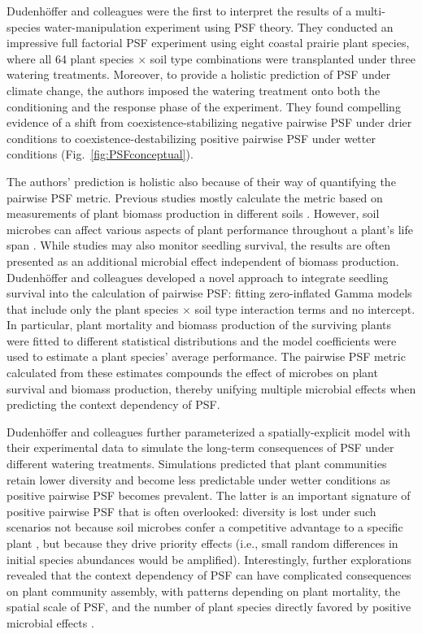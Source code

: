 \documentclass[hidelinks,letterpaper, 11pt]{article}
\begin{document}
Dudenh{\"o}ffer and colleagues were the first to interpret the results of a multi-species water-manipulation experiment using PSF theory. 
They conducted an impressive full factorial PSF experiment using eight coastal prairie plant species, where all 64 plant species $\times$ soil type combinations were transplanted under three watering treatments.
Moreover, to provide a holistic prediction of PSF under climate change, the authors imposed the watering treatment onto both the conditioning and the response phase of the experiment.
They found compelling evidence of a shift from coexistence-stabilizing negative pairwise PSF under drier conditions to coexistence-destabilizing positive pairwise PSF under wetter conditions (Fig.~\ref{fig:PSFconceptual}).
\medskip


The authors' prediction is holistic also because of their way of quantifying the pairwise PSF metric. 
Previous studies mostly calculate the metric based on measurements of plant biomass production in different soils \citep{Crawford2019}.
However, soil microbes can affect various aspects of plant performance throughout a plant's life span \citep{Dudenhoffer2017}.
While studies may also monitor seedling survival, the results are often presented as an additional microbial effect independent of biomass production.
Dudenh{\"o}ffer and colleagues developed a novel approach to integrate seedling survival into the calculation of pairwise PSF: fitting zero-inflated Gamma models that include only the plant species $\times$ soil type interaction terms and no intercept.
In particular, plant mortality and biomass production of the surviving plants were fitted to different statistical distributions and the model coefficients were used to estimate a plant species' average performance. 
The pairwise PSF metric \citep{Bever1997} calculated from these estimates compounds the effect of microbes on plant survival and biomass production, thereby unifying multiple microbial effects when predicting the context dependency of PSF. 
\medskip


Dudenh{\"o}ffer and colleagues further parameterized a spatially-explicit model with their experimental data to simulate the long-term consequences of PSF under different watering treatments. 
Simulations predicted that plant communities retain lower diversity and become less predictable under wetter conditions as positive pairwise PSF becomes prevalent.
The latter is an important signature of positive pairwise PSF that is often overlooked: diversity is lost under such scenarios not because soil microbes confer a competitive advantage to a specific plant \citep{Kandlikar2019}, but because they drive priority effects (i.e., small random differences in initial species abundances would be amplified).
Interestingly, further explorations revealed that the context dependency of PSF can have complicated consequences on plant community assembly, with patterns depending on plant mortality, the spatial scale of PSF, and the number of plant species directly favored by positive microbial effects \citep{Kandlikar2019}. 
\medskip
\end{document}
